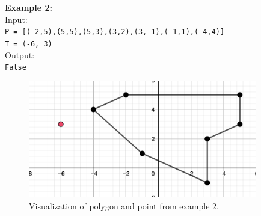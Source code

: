 \documentclass[a4paper,11pt]{article}
\begin{document}
\noindent
\textbf{Example 2:} \\
Input: \\
\texttt{P = [(-2,5),(5,5),(5,3),(3,2),(3,-1),(-1,1),(-4,4)]}
\\
\texttt{T = (-6, 3)}
\\
Output: \\
\texttt{False}
\begin{figure}[ht!]
    \centering
    \includegraphics[width=100mm]{j2.png}
    \caption{Visualization of polygon and point from example 2.}
\end{figure}
\end{document}
